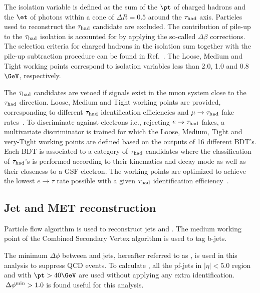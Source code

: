 The isolation variable is defined as the sum of the $\pt$ of charged hadrons and the $\et$ of photons within a cone of $\Delta R = 0.5$ around the $\tau_{\rm had}$ axis. Particles used to reconstruct the $\tau_{\rm had}$ candidate are excluded. The contribution of pile-up to the $\tau_{\rm had}$ isolation is accounted for by applying the so-called $\Delta\beta$ corrections. The selection criteria for charged hadrons in the isolation sum together with the pile-up subtraction procedure can be found in Ref.~\cite{CMS_AN_2013-171}. The Loose, Medium and Tight working points correspond to isolation variables less than 2.0, 1.0 and 0.8\,$\GeV$, respectively.

The $\tau_{\rm had}$ candidates are vetoed if signals exist in the muon system close to the $\tau_{\rm had}$ direction. Loose, Medium and Tight working points are provided, corresponding to different $\tau_{\rm had}$ identification efficiencies and $\mu\to\tau_{\rm had}$ fake rates~\cite{CMS_AN_2013-171}. To discriminate against electrons i.e., rejecting $e\to\tau_{\rm had}$ fakes, a multivariate discriminator is trained for which the Loose, Medium, Tight and very-Tight working points are defined based on the outputs of 16 different BDT's. Each BDT is associated to a category of $\tau_{\rm had}$ candidates where the classification of $\tau_{\rm had}$'s is performed according to their kinematics and decay mode as well as their closeness to a GSF electron. The working points are optimized to achieve the lowest $e\to\tau$ rate possible with a given $\tau_{\rm had}$ identification efficiency~\cite{CMS_AN_2012-417}.

\subsection{Jet and MET reconstruction}
\label{sec:jetmet}
Particle flow algorithm is used to reconstruct jets and \ETmiss. The medium working point of the Combined Secondary Vertex algorithm is used to tag b-jets.

The minimum $\Delta\phi$ between \ETmiss and jets, hereafter referred to as \mindphifour, is used in this analysis to suppress QCD events. To calculate \mindphifour, all the pf-jets in $|\eta|<5.0$ region and with $\pt>40\GeV$ are used without applying any extra identification. $\,{\Delta\phi^{\rm min}} > 1.0$ is found useful for this analysis.

